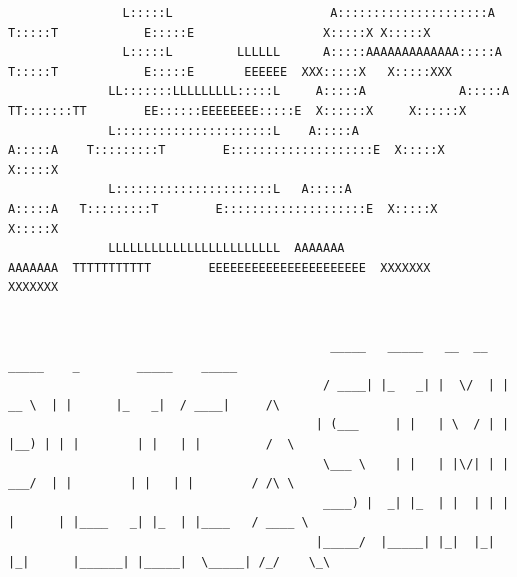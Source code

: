 \documentclass[A4 paper,openany]{book}  %
\begin{document}
\begin{titlepage}
{\begin{verbatim}
                L:::::L                      A:::::::::::::::::::::A         T:::::T            E:::::E                  X:::::X X:::::X                                                                                                                                        
                L:::::L         LLLLLL      A:::::AAAAAAAAAAAAA:::::A        T:::::T            E:::::E       EEEEEE  XXX:::::X   X:::::XXX                                                                                                                                     
              LL:::::::LLLLLLLLL:::::L     A:::::A             A:::::A     TT:::::::TT        EE::::::EEEEEEEE:::::E  X::::::X     X::::::X                                                                                                                                     
              L::::::::::::::::::::::L    A:::::A               A:::::A    T:::::::::T        E::::::::::::::::::::E  X:::::X       X:::::X                                                                                                                                     
              L::::::::::::::::::::::L   A:::::A                 A:::::A   T:::::::::T        E::::::::::::::::::::E  X:::::X       X:::::X                                                                                                                                     
              LLLLLLLLLLLLLLLLLLLLLLLL  AAAAAAA                   AAAAAAA  TTTTTTTTTTT        EEEEEEEEEEEEEEEEEEEEEE  XXXXXXX       XXXXXXX                                                                                                                                     
                                                                                                                                                                                                                                                              
                                                                                                                                                                                                                                                              
                                             _____   _____   __  __   _____    _        _____    _____            
                                            / ____| |_   _| |  \/  | |  __ \  | |      |_   _|  / ____|     /\    
                                           | (___     | |   | \  / | | |__) | | |        | |   | |         /  \   
                                            \___ \    | |   | |\/| | |  ___/  | |        | |   | |        / /\ \  
                                            ____) |  _| |_  | |  | | | |      | |____   _| |_  | |____   / ____ \ 
                                           |_____/  |_____| |_|  |_| |_|      |______| |_____|  \_____| /_/    \_\
                                                                                            

\end{verbatim}}
\end{titlepage}
\end{document}
